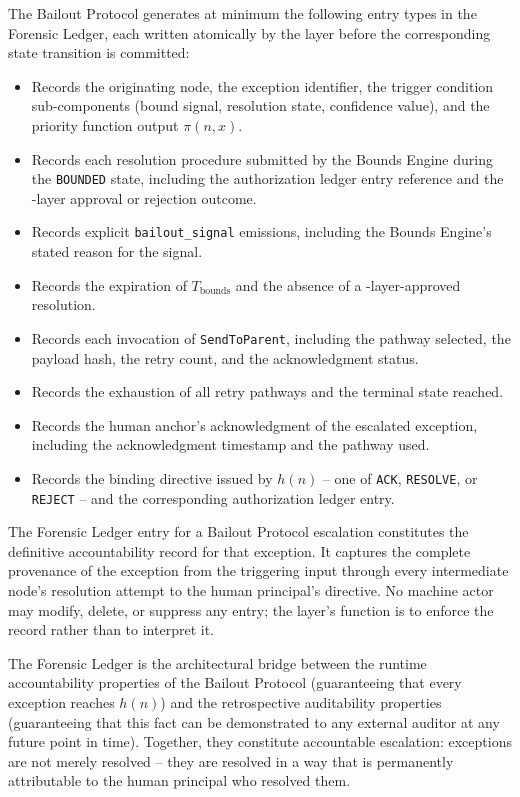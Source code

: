 The Bailout Protocol generates at minimum the following entry types in the
Forensic Ledger, each written atomically by the \fact{} layer before the
corresponding state transition is committed:

\begin{itemize}\itemsep=0pt
\item[\texttt{bailout-trigger}] Records the originating node, the exception
identifier, the trigger condition sub-components (bound signal, resolution
state, confidence value), and the priority function output $\pi(n, x)$.
\item[\texttt{bounds-resolution-attempt}] Records each resolution procedure
submitted by the Bounds Engine during the \texttt{BOUNDED} state, including
the authorization ledger entry reference and the \fact-layer approval or
rejection outcome.
\item[\texttt{bailout-signal}] Records explicit \texttt{bailout\_signal}
emissions, including the Bounds Engine's stated reason for the signal.
\item[\texttt{timeout-bounds-expired}] Records the expiration of
$T_{\text{bounds}}$ and the absence of a \fact-layer-approved resolution.
\item[\texttt{escalation-sent}] Records each invocation of
\texttt{SendToParent}, including the pathway selected, the payload hash,
the retry count, and the acknowledgment status.
\item[\texttt{pathway-exhausted}] Records the exhaustion of all retry
pathways and the terminal state reached.
\item[\texttt{human-ack}] Records the human anchor's acknowledgment of the
escalated exception, including the acknowledgment timestamp and the pathway
used.
\item[\texttt{human-directive}] Records the binding directive issued by
$h(n)$ -- one of \texttt{ACK}, \texttt{RESOLVE}, or \texttt{REJECT} -- and
the corresponding authorization ledger entry.
\end{itemize}

The Forensic Ledger entry for a Bailout Protocol escalation constitutes the
definitive accountability record for that exception.  It captures the complete
provenance of the exception from the triggering input through every
intermediate node's resolution attempt to the human principal's directive.
No machine actor may modify, delete, or suppress any entry; the layer's
function is to enforce the record rather than to interpret it.

The Forensic Ledger is the architectural bridge between the runtime
accountability properties of the Bailout Protocol (guaranteeing that every
exception reaches $h(n)$) and the retrospective auditability properties
(guaranteeing that this fact can be demonstrated to any external auditor
at any future point in time).  Together, they constitute accountable
escalation: exceptions are not merely resolved -- they are resolved in a
way that is permanently attributable to the human principal who resolved them.

